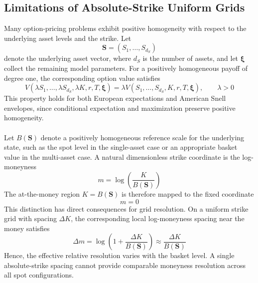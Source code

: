 \documentclass{article}
\numberwithin{equation}{subsection}
\theoremstyle{definition}
\theoremstyle{remark}
\begin{document}
\subsection{Limitations of Absolute-Strike Uniform Grids}
\label{subsec:absolute-strike-limitations}
Many option-pricing problems exhibit positive homogeneity with respect to the
underlying asset levels and the strike. Let
\begin{equation}
\boldsymbol{S} = (S_1,\ldots,S_{d_S})
\end{equation}
denote the underlying asset vector, where $d_S$ is the number of assets, and
let $\boldsymbol{\xi}$ collect the
remaining model parameters. For a positively homogeneous payoff of degree one,
the corresponding option value satisfies
\begin{equation}
V( \lambda S_1,\ldots,\lambda S_{d_S}, \lambda K, r,T,\boldsymbol{\xi} ) = \lambda V( S_1,\ldots,S_{d_S}, K,r,T,\boldsymbol{\xi} ), \qquad \lambda>0
\label{eq:homogeneity-preview}
\end{equation}
This property holds for both European expectations and American Snell envelopes,
since conditional expectation and maximization preserve positive homogeneity. \\
\\
Let $B(\boldsymbol{S})$ denote a positively homogeneous reference scale for the
underlying state, such as the spot level in the single-asset case or an
appropriate basket value in the multi-asset case. A natural dimensionless strike
coordinate is the log-moneyness
\begin{equation}
m = \log\!\left( \frac{K}{B(\boldsymbol{S})} \right)
\label{eq:basket-log-moneyness}
\end{equation}
The at-the-money region $K = B(\boldsymbol{S})$ is therefore mapped to the fixed coordinate \begin{equation}
m=0
\label{eq:atm-hyperplane}
\end{equation}
This distinction has direct consequences for grid resolution. On a uniform
strike grid with spacing $\Delta K$, the corresponding local log-moneyness
spacing near the money satisfies
\begin{equation}
\Delta m = \log\!\left( 1+\frac{\Delta K}{B(\boldsymbol{S})} \right) \approx \frac{\Delta K}{B(\boldsymbol{S})}
\end{equation}
Hence, the effective relative resolution varies with the basket level. A single
absolute-strike spacing cannot provide comparable moneyness resolution across
all spot configurations.\\
\end{document}
